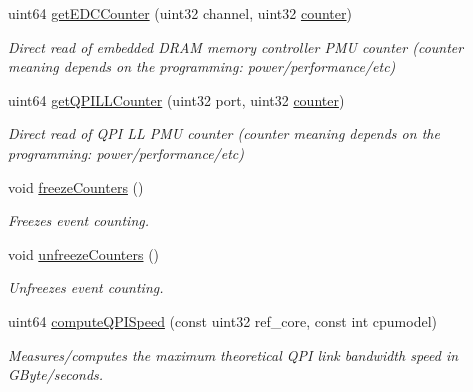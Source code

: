 \begin{DoxyCompactItemize}
uint64 \mbox{\hyperlink{class_server_p_c_i_c_f_g_uncore_aa48e2113a37b0727b1dbe27c391ccd04}{get\+E\+D\+C\+Counter}} (uint32 channel, uint32 \mbox{\hyperlink{structcounter}{counter}})
\begin{DoxyCompactList}\small\item\em Direct read of embedded D\+R\+AM memory controller P\+MU counter (counter meaning depends on the programming\+: power/performance/etc) \end{DoxyCompactList}\item 
uint64 \mbox{\hyperlink{class_server_p_c_i_c_f_g_uncore_abcd9990a39fb245bb552e6cae4922305}{get\+Q\+P\+I\+L\+L\+Counter}} (uint32 port, uint32 \mbox{\hyperlink{structcounter}{counter}})
\begin{DoxyCompactList}\small\item\em Direct read of Q\+PI LL P\+MU counter (counter meaning depends on the programming\+: power/performance/etc) \end{DoxyCompactList}\item 
\mbox{\label{class_server_p_c_i_c_f_g_uncore_ad4bda64cc17432d44ee8e380a735b795}} 
void \mbox{\hyperlink{class_server_p_c_i_c_f_g_uncore_ad4bda64cc17432d44ee8e380a735b795}{freeze\+Counters}} ()
\begin{DoxyCompactList}\small\item\em Freezes event counting. \end{DoxyCompactList}\item 
\mbox{\label{class_server_p_c_i_c_f_g_uncore_a379962b379f637f3b752f7fb4666c7e7}} 
void \mbox{\hyperlink{class_server_p_c_i_c_f_g_uncore_a379962b379f637f3b752f7fb4666c7e7}{unfreeze\+Counters}} ()
\begin{DoxyCompactList}\small\item\em Unfreezes event counting. \end{DoxyCompactList}\item 
\mbox{\label{class_server_p_c_i_c_f_g_uncore_a42a0e1343ab38371279bf9def8123419}} 
uint64 \mbox{\hyperlink{class_server_p_c_i_c_f_g_uncore_a42a0e1343ab38371279bf9def8123419}{compute\+Q\+P\+I\+Speed}} (const uint32 ref\+\_\+core, const int cpumodel)
\begin{DoxyCompactList}\small\item\em Measures/computes the maximum theoretical Q\+PI link bandwidth speed in G\+Byte/seconds. \end{DoxyCompactList}\item 

\end{DoxyCompactItemize}
